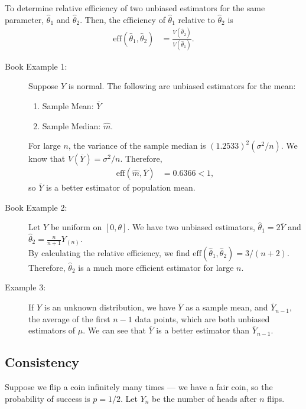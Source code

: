 \documentclass[10pt]{extarticle}
\begin{document}
  To determine relative efficiency of two unbiased estimators for the same parameter, $\hat{\theta}_1$ and $\hat{\theta}_2$. Then, the efficiency of $\hat{\theta}_1$ relative to $\hat{\theta}_2$ is
  \begin{align*}
    \text{eff}(\hat{\theta}_1,\hat{\theta}_2) &= \frac{V(\hat{\theta}_2)}{V(\hat{\theta}_1)}.
  \end{align*}
  \begin{description}
    \item[Book Example 1:] Suppose $Y$ is normal. The following are unbiased estimators for the mean:
      \begin{enumerate}[(1)]
        \item Sample Mean: $\overline{Y}$
        \item Sample Median: $\hat{m}$.
      \end{enumerate}
      For large $n$, the variance of the sample median is $(1.2533)^2(\sigma^2/n)$. We know that $V(\overline{Y}) = \sigma^2/n$. Therefore,
      \begin{align*}
        \text{eff}(\hat{m},\overline{Y}) &= 0.6366 < 1,
      \end{align*}
      so $\overline{Y}$ is a better estimator of population mean.
    \item[Book Example 2:] Let $Y$ be uniform on $[0,\theta]$. We have two unbiased estimators, $\hat{\theta}_1 = 2\overline{Y}$ and $\hat{\theta}_2 = \frac{n}{n+1}Y_{(n)}$.\\

      By calculating the relative efficiency, we find $\text{eff}(\hat{\theta}_1,\hat{\theta}_2) = 3/(n+2)$. Therefore, $\hat{\theta}_2$ is a much more efficient estimator for large $n$.
    \item[Example 3:] If $Y$ is an unknown distribution, we have $\overline{Y}$ as a sample mean, and $\overline{Y}_{n-1}$, the average of the first $n-1$ data points, which are both unbiased estimators of $\mu$. We can see that $\overline{Y}$ is a better estimator than $\overline{Y}_{n-1}$.
  \end{description}
  \subsection{Consistency}%
  Suppose we flip a coin infinitely many times --- we have a fair coin, so the probability of success is $p = 1/2$. Let $Y_n$ be the number of heads after $n$ flips.\\
\end{document}

